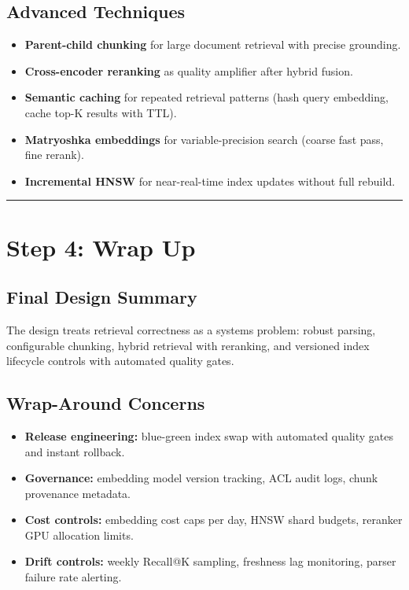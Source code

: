 \subsection*{Advanced Techniques}

\begin{itemize}
  \item \textbf{Parent-child chunking} for large document retrieval with precise grounding.
  \item \textbf{Cross-encoder reranking} as quality amplifier after hybrid fusion.
  \item \textbf{Semantic caching} for repeated retrieval patterns (hash query embedding, cache top-K results with TTL).
  \item \textbf{Matryoshka embeddings} for variable-precision search (coarse fast pass, fine rerank).
  \item \textbf{Incremental HNSW} for near-real-time index updates without full rebuild.
\end{itemize}

\bigskip\hrule\bigskip

\section*{Step 4: Wrap Up}

\subsection*{Final Design Summary}

The design treats retrieval correctness as a systems problem: robust parsing, configurable chunking, hybrid retrieval with reranking, and versioned index lifecycle controls with automated quality gates.

\subsection*{Wrap-Around Concerns}

\begin{itemize}
  \item \textbf{Release engineering:} blue-green index swap with automated quality gates and instant rollback.
  \item \textbf{Governance:} embedding model version tracking, ACL audit logs, chunk provenance metadata.
  \item \textbf{Cost controls:} embedding cost caps per day, HNSW shard budgets, reranker GPU allocation limits.
  \item \textbf{Drift controls:} weekly Recall@K sampling, freshness lag monitoring, parser failure rate alerting.
\end{itemize}

